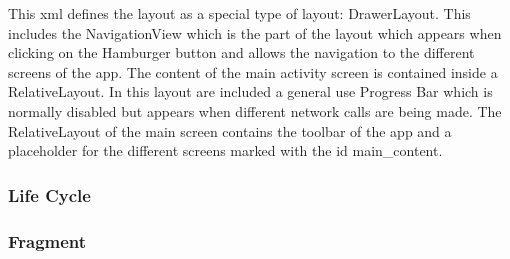 This xml defines the layout as a special type of layout: DrawerLayout. This includes the NavigationView which is the part of the layout which appears when clicking on the Hamburger button and allows the navigation to the different screens of the app. The content of the main activity screen is contained inside a RelativeLayout. In this layout are included a general use Progress Bar which is normally disabled but appears when different network calls are being made. The RelativeLayout of the main screen contains the toolbar of the app and a placeholder for the different screens marked with the id main\_content.

\subsubsection { Life Cycle }

\subsubsection { Fragment }